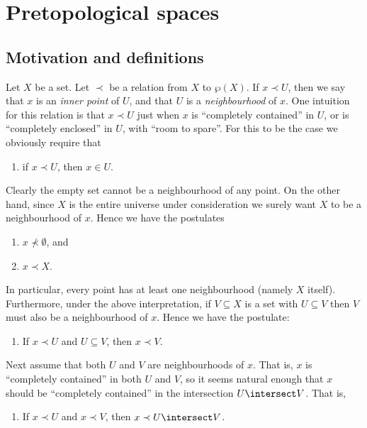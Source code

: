 \documentclass[article, a4paper, 11pt, oneside]{memoir}
\title{\doctitle}
\author{\docauthor}
\numberwithin{equation}{chapter}
\newcommand{\inpoint}{\prec}
\newcommand{\notinpoint}{\not\prec}
\renewcommand{\powerset}[1]{\wp(#1)}
\begin{document}
\maketitle

\chapter{Pretopological spaces}

\section{Motivation and definitions}

Let $X$ be a set. Let $\inpoint$ be a relation from $X$ to $\powerset{X}$. If $x \inpoint U$, then we say that $x$ is an \emph{inner point} of $U$, and that $U$ is a \emph{neighbourhood} of $x$. One intuition for this relation is that $x \inpoint U$ just when $x$ is \enquote{completely contained} in $U$, or is \enquote{completely enclosed} in $U$, with \enquote{room to spare}. For this to be the case we obviously require that
%
\begin{enumerate}
    \item if $x \inpoint U$, then $x \in U$.
\end{enumerate}
%
Clearly the empty set cannot be a neighbourhood of any point. On the other hand, since $X$ is the entire universe under consideration we surely want $X$ to be a neighbourhood of $x$. Hence we have the postulates
%
\begin{enumerate}[resume]
    \item $x \notinpoint \emptyset$, and
    \item $x \inpoint X$.
\end{enumerate}
%
In particular, every point has at least one neighbourhood (namely $X$ itself). Furthermore, under the above interpretation, if $V \subseteq X$ is a set with $U \subseteq V$ then $V$ must also be a neighbourhood of $x$. Hence we have the postulate:
%
\begin{enumerate}[resume]
    \item If $x \inpoint U$ and $U \subseteq V$, then $x \inpoint V$.
\end{enumerate}
%
Next assume that both $U$ and $V$ are neighbourhoods of $x$. That is, $x$ is \enquote{completely contained} in both $U$ and $V$, so it seems natural enough that $x$ should be \enquote{completely contained} in the intersection $U \intersect V$. That is,
%
\begin{enumerate}[resume]
    \item If $x \inpoint U$ and $x \inpoint V$, then $x \inpoint U \intersect V$.
\end{enumerate}
\end{document}
